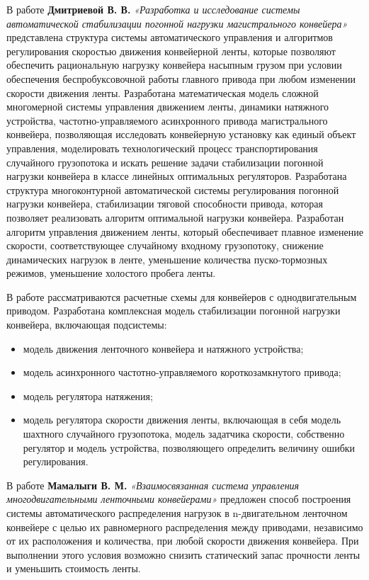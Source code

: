 В работе \textbf{Дмитриевой В. В.} \textit{«Разработка и исследование системы автоматической стабилизации погонной нагрузки магистрального конвейера»} \cite{vdmitrieva} представлена структура системы автоматического управления и алгоритмов регулирования скоростью движения конвейерной ленты, которые позволяют обеспечить рациональную нагрузку конвейера насыпным грузом при условии обеспечения беспробуксовочной работы главного привода при любом изменении скорости движения ленты. Разработана математическая модель сложной многомерной системы управления движением ленты, динамики натяжного устройства, частотно-управляемого асинхронного привода магистрального конвейера, позволяющая исследовать конвейерную установку как единый объект управления, моделировать технологический процесс транспортирования случайного грузопотока и искать решение задачи стабилизации погонной нагрузки конвейера в классе линейных оптимальных регуляторов. Разработана структура многоконтурной автоматической системы регулирования погонной нагрузки конвейера, стабилизации тяговой способности привода, которая позволяет реализовать алгоритм оптимальной нагрузки конвейера. Разработан алгоритм управления движением ленты, который обеспечивает плавное изменение скорости, соответствующее случайному входному грузопотоку, снижение динамических нагрузок в ленте, уменьшение количества пуско-тормозных режимов, уменьшение холостого пробега ленты.

В работе рассматриваются расчетные схемы для конвейеров с однодвигательным приводом. Разработана комплексная модель стабилизации погонной нагрузки конвейера, включающая подсистемы:
\begin{itemize}
\item модель движения ленточного конвейера и натяжного устройства;
\item модель асинхронного частотно-управляемого короткозамкнутого привода;
\item модель регулятора натяжения;
\item модель регулятора скорости движения ленты, включающая в себя модель шахтного случайного грузопотока, модель задатчика скорости, собственно регулятор и модель устройства, позволяющего определить величину ошибки регулирования.
\end{itemize}

В работе \textbf{Мамалыги В. М.} \textit{«Взаимосвязанная система управления многодвигательными ленточными конвейерами»} \cite{vmamalyga}  предложен способ построения системы автоматического распределения нагрузок в n-двигательном ленточном конвейере с целью их равномерного распределения между приводами, независимо от их расположения и количества, при любой скорости движения конвейера. При выполнении этого условия возможно снизить статический запас прочности ленты и уменьшить стоимость ленты. 

